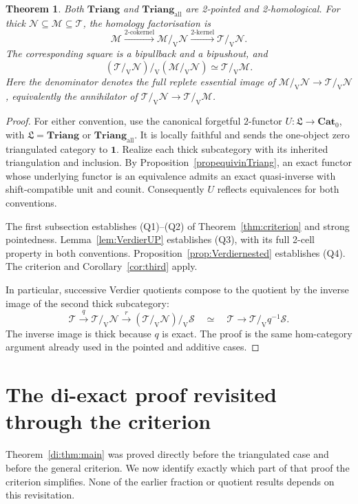 \documentclass[11pt,reqno,a4paper]{amsart}
\newtheorem{theorem}{Theorem}[section]
\theoremstyle{definition}
\theoremstyle{remark}
\newcommand{\M}{\mathcal{M}}
\newcommand{\N}{\mathcal{N}}
\newcommand{\T}{\mathcal{T}}
\newcommand{\0}{\mathbf{0}}
\renewcommand{\1}{\mathbf{1}}
\newcommand{\Triang}{\mathbf{Triang}}
\newcommand{\Pt}{\mathbf{Cat}_{0}}
\newcommand{\Tri}{\Triang}
\newcommand{\TriAll}{\mathbf{Triang}_{\mathrm{all}}}
\newcommand{\Lcat}{\mathfrak L}
\newcommand{\Scl}{\mathcal S}
\newcommand{\vq}[2]{#1/_{\!\mathrm V}#2}
\begin{document}
\begin{theorem}\label{thm:triangulated}
Both $\Tri$ and $\TriAll$ are 2-pointed and 2-homological.
For thick $\N\subseteq\M\subseteq\T$, the homology factorisation is
\[
 \M\xrightarrow{\text{2-cokernel}}\vq{\M}{\N}
 \xrightarrow{\text{2-kernel}}\vq{\T}{\N}.
\]
The corresponding square is a bipullback and a bipushout, and
\[
 (\vq{\T}{\N})/_{\!\mathrm V}(\vq{\M}{\N})
 \simeq\vq{\T}{\M}.
\]
Here the denominator denotes the full replete essential image of
$\vq{\M}{\N}\to\vq{\T}{\N}$, equivalently the annihilator of
$\vq{\T}{\N}\to\vq{\T}{\M}$.
\end{theorem}
\begin{proof}
For either convention, use the canonical forgetful
$2$-functor $U:\Lcat\to\Pt$, with
$\Lcat=\Tri$ or $\TriAll$. It is locally faithful and
sends the one-object zero triangulated category to
$\mathbf1$. Realize each thick subcategory with its
inherited triangulation and inclusion. By
Proposition~\ref{propequivinTriang}, an exact functor
whose underlying functor is an equivalence admits an exact
quasi-inverse with shift-compatible unit and counit.
Consequently $U$ reflects equivalences for both conventions.

The first subsection establishes (Q1)--(Q2) of
Theorem~\ref{thm:criterion} and strong pointedness.
Lemma~\ref{lem:VerdierUP} establishes (Q3), with its full 2-cell
property in both conventions. Proposition~\ref{prop:Verdiernested}
establishes (Q4). The criterion and Corollary~\ref{cor:third} apply.

In particular, successive Verdier quotients compose to the quotient
by the inverse image of the second thick subcategory:
\[
 \T\xrightarrow{q}\vq{\T}{\N}
 \xrightarrow{r}(\vq{\T}{\N})/_{\!\mathrm V}\Scl
 \quad\simeq\quad
 \T\longrightarrow\vq{\T}{q^{-1}\Scl}.
\]
The inverse image is thick because $q$ is exact. The proof is the same
hom-category argument already used in the pointed and additive cases.
\end{proof}

\section{The di-exact proof revisited through the criterion}\label{sec:di-revisited}

Theorem~\ref{di:thm:main} was proved directly before the
triangulated case and before the general criterion. We now identify
exactly which part of that proof the criterion simplifies. None of
the earlier fraction or quotient results depends on this revisitation.
\end{document}
